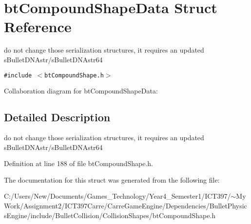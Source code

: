 \hypertarget{structbt_compound_shape_data}{
\section{btCompoundShapeData Struct Reference}
\label{structbt_compound_shape_data}
}
do not change those serialization structures, it requires an updated sBulletDNAstr/sBulletDNAstr64  


{\tt \#include $<$btCompoundShape.h$>$}

Collaboration diagram for btCompoundShapeData:

\subsection{Detailed Description}
do not change those serialization structures, it requires an updated sBulletDNAstr/sBulletDNAstr64 

Definition at line 188 of file btCompoundShape.h.

The documentation for this struct was generated from the following file:\begin{CompactItemize}
\item 
C:/Users/New/Documents/Games\_\-Technology/Year4\_\-Semester1/ICT397/$\sim$My Work/Assignment2/ICT397Carre/CarreGameEngine/Dependencies/BulletPhysicsEngine/include/BulletCollision/CollisionShapes/btCompoundShape.h\end{CompactItemize}
